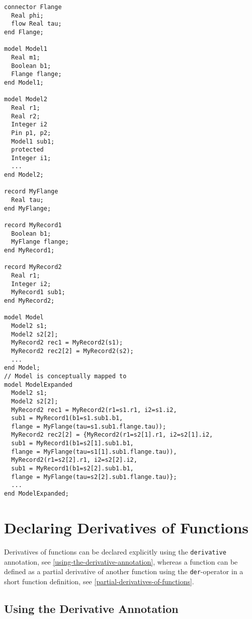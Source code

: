\begin{example}
\begin{lstlisting}[language=modelica]
connector Flange
  Real phi;
  flow Real tau;
end Flange;

model Model1
  Real m1;
  Boolean b1;
  Flange flange;
end Model1;

model Model2
  Real r1;
  Real r2;
  Integer i2
  Pin p1, p2;
  Model1 sub1;
  protected
  Integer i1;
  ...
end Model2;

record MyFlange
  Real tau;
end MyFlange;

record MyRecord1
  Boolean b1;
  MyFlange flange;
end MyRecord1;

record MyRecord2
  Real r1;
  Integer i2;
  MyRecord1 sub1;
end MyRecord2;

model Model
  Model2 s1;
  Model2 s2[2];
  MyRecord2 rec1 = MyRecord2(s1);
  MyRecord2 rec2[2] = MyRecord2(s2);
  ...
end Model;
// Model is conceptually mapped to
model ModelExpanded
  Model2 s1;
  Model2 s2[2];
  MyRecord2 rec1 = MyRecord2(r1=s1.r1, i2=s1.i2,
  sub1 = MyRecord1(b1=s1.sub1.b1,
  flange = MyFlange(tau=s1.sub1.flange.tau));
  MyRecord2 rec2[2] = {MyRecord2(r1=s2[1].r1, i2=s2[1].i2,
  sub1 = MyRecord1(b1=s2[1].sub1.b1,
  flange = MyFlange(tau=s1[1].sub1.flange.tau)),
  MyRecord2(r1=s2[2].r1, i2=s2[2].i2,
  sub1 = MyRecord1(b1=s2[2].sub1.b1,
  flange = MyFlange(tau=s2[2].sub1.flange.tau)};
  ...
end ModelExpanded;
\end{lstlisting}
\end{example}

\section{Declaring Derivatives of Functions}

Derivatives of functions can be declared explicitly using the \lstinline!derivative!
annotation, see \autoref{using-the-derivative-annotation}, whereas a function can be defined as a
partial derivative of another function using the \lstinline!der!-operator in a short
function definition, see \autoref{partial-derivatives-of-functions}.

\subsection{Using the Derivative Annotation}

